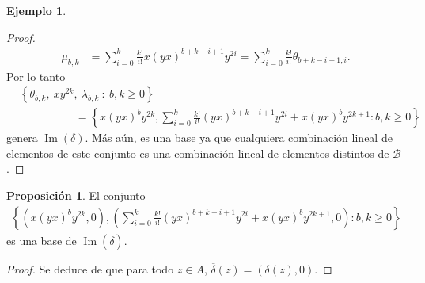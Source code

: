 \documentclass[a4paper,oneside,fleqn,11pt]{report}
\newcommand\base{\mathcal{B}}
\theoremstyle{definition}
\theoremstyle{definition}
\newtheorem{example}{Ejemplo}[section]
\newtheorem{prop}{Proposición}
\numberwithin{prop}{subsection}
\DeclareMathOperator\Ima{Im}
\begin{document}
\begin{example}
\begin{proof}
\begin{align*}
	\mu_{b,k} &= \sum_{i = 0}^k\frac{k!}{i!}x(yx)^{b + k - i + 1}y^{2i}
		= \sum_{i = 0}^k\frac{k!}{i!}\theta_{b + k - i + 1, i}.
\end{align*}
Por lo tanto
\begin{align*}
	&\left\{\theta_{b,k},\ xy^{2k},\ \lambda_{b,k}\ :\ b,k \geq 0 \right\} \\
	&\hspace{60pt}= \left\{ x(yx)^by^{2k},
			\sum_{i = 0}^k\frac{k!}{i!}(yx)^{b + k - i + 1}y^{2i} + x(yx)^by^{2k + 1} :b, k \geq 0 \right\}
\end{align*}
genera $\Ima(\delta)$. Más aún, es una base ya que cualquiera combinación lineal de elementos de este conjunto es una
combinación lineal de elementos distintos de $\base$.
\end{proof}
\begin{prop}
El conjunto
\begin{align*}
		\left\{ \left(x(yx)^by^{2k}, 0\right),
			\left(\sum_{i = 0}^k\frac{k!}{i!}(yx)^{b + k - i + 1}y^{2i} + x(yx)^by^{2k + 1},0\right) :b, k \geq 0 \right\}
\end{align*}
es una base de $\Ima(\overline{\delta})$.
\end{prop}
\begin{proof}
	Se deduce de que para todo $z \in A$, $\overline{\delta}(z) = (\delta(z), 0)$.
\end{proof}


\end{example}
\end{document}
